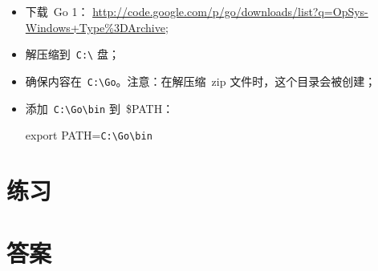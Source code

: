 \begin{itemize}
\item 下载~Go 1：
\url{http://code.google.com/p/go/downloads/list?q=OpSys-Windows+Type%3DArchive};
\item 解压缩到~\verb|C:\| 盘；
\item 确保内容在~\verb|C:\Go|。注意：在解压缩~zip 文件时，这个目录会被创建；
\item 添加~\verb|C:\Go\bin| 到~\$PATH：
\begin{display}
export PATH=\verb|C:\Go\bin|
\end{display}
\end{itemize}

\section{练习}


\cleardoublepage
\section{答案}
\shipoutAnswer
